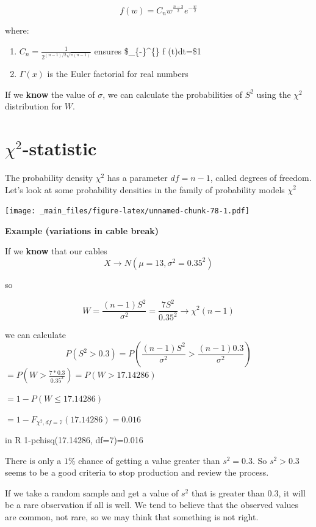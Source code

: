 \documentclass[
]{book}
\providecommand{\tightlist}{%
  \setlength{\itemsep}{0pt}\setlength{\parskip}{0pt}}
\begin{document}
\[f(w)=C_n w^{\frac{n-3}{2}} e^{-\frac{w}{2}}\]

where:

\begin{enumerate}
\def\labelenumi{\arabic{enumi})}
\tightlist
\item
  \(C_n=\frac{1}{2^{(n-1)/2\sqrt{\pi(n-1)}}}\) ensures \$\int\_\{-\infty\}\^{}\{\infty\} f (t)dt=\$1
\item
  \(\Gamma(x)\) is the Euler factorial for real numbers
\end{enumerate}

If we \textbf{know} the value of \(\sigma\), we can calculate the probabilities of \(S^2\) using the \(\chi^2\) distribution for \(W\).

\hypertarget{chi2-statistic}{%
\section{\texorpdfstring{\(\chi^2\)-statistic}{\textbackslash chi\^{}2-statistic}}\label{chi2-statistic}}

The probability density \(\chi^2\) has a parameter \(df=n-1\), called degrees of freedom. Let's look at some probability densities in the family of probability models \(\chi^2\)

\texttt{[image: \_main\_files/figure-latex/unnamed-chunk-78-1.pdf]}

\textbf{Example (variations in cable break)}

If we \textbf{know} that our cables
\[X \rightarrow N(\mu=13, \sigma^2=0.35^2)\]

so

\[W=\frac{(n-1)S^2}{\sigma^2}= \frac{7S^2}{0.35^2} \rightarrow \chi^2(n-1)\]

we can calculate \[P(S^2 > 0.3)=P(\frac{(n-1)S^2}{\sigma^2} > \frac{(n-1)0.3}{\sigma^2 } )\]
\(=P(W > \frac{7*0.3}{0.35^2})=P(W > 17.14286)\)

\(=1-P(W \leq 17.14286)\)

\(= 1- F_{\chi^2,df=7}(17.14286)=0.016\)

in R
1-pchisq(17.14286, df=7)=0.016

There is only a \(1\%\) chance of getting a value greater than \(s^2=0.3\). So \(s^2>0.3\) seems to be a good criteria to stop production and review the process.

If we take a random sample and get a value of \(s ^2\) that is greater than \(0.3\), it will be a rare observation if all is well. We tend to believe that the observed values are common, not rare, so we may think that something is not right.
\end{document}
